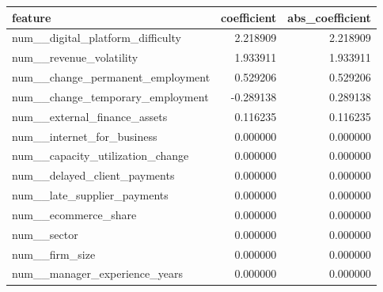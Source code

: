 \begin{tabular}{lrr}
\toprule
feature & coefficient & abs\_coefficient \\
\midrule
num\_\_digital\_platform\_difficulty & 2.218909 & 2.218909 \\
num\_\_revenue\_volatility & 1.933911 & 1.933911 \\
num\_\_change\_permanent\_employment & 0.529206 & 0.529206 \\
num\_\_change\_temporary\_employment & -0.289138 & 0.289138 \\
num\_\_external\_finance\_assets & 0.116235 & 0.116235 \\
num\_\_internet\_for\_business & 0.000000 & 0.000000 \\
num\_\_capacity\_utilization\_change & 0.000000 & 0.000000 \\
num\_\_delayed\_client\_payments & 0.000000 & 0.000000 \\
num\_\_late\_supplier\_payments & 0.000000 & 0.000000 \\
num\_\_ecommerce\_share & 0.000000 & 0.000000 \\
num\_\_sector & 0.000000 & 0.000000 \\
num\_\_firm\_size & 0.000000 & 0.000000 \\
num\_\_manager\_experience\_years & 0.000000 & 0.000000 \\
\bottomrule
\end{tabular}

